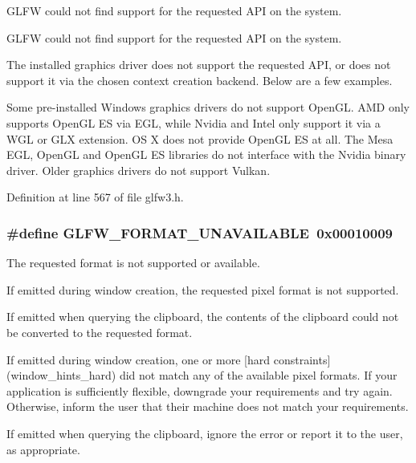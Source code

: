GLFW could not find support for the requested API on the system. 

GLFW could not find support for the requested API on the system.

The installed graphics driver does not support the requested API, or does not support it via the chosen context creation backend. Below are a few examples.

\begin{Desc}
\item[]Some pre-installed Windows graphics drivers do not support OpenGL. AMD only supports OpenGL ES via EGL, while Nvidia and Intel only support it via a WGL or GLX extension. OS X does not provide OpenGL ES at all. The Mesa EGL, OpenGL and OpenGL ES libraries do not interface with the Nvidia binary driver. Older graphics drivers do not support Vulkan. \end{Desc}


Definition at line 567 of file glfw3.h.\hypertarget{group__errors_g196e125ef261d94184e2b55c05762f14}{
\subsubsection[GLFW\_\-FORMAT\_\-UNAVAILABLE]{\setlength{\rightskip}{0pt plus 5cm}\#define GLFW\_\-FORMAT\_\-UNAVAILABLE~0x00010009}}
\label{group__errors_g196e125ef261d94184e2b55c05762f14}


The requested format is not supported or available. 

If emitted during window creation, the requested pixel format is not supported.

If emitted when querying the clipboard, the contents of the clipboard could not be converted to the requested format.

If emitted during window creation, one or more \mbox{[}hard constraints\mbox{]}(window\_\-hints\_\-hard) did not match any of the available pixel formats. If your application is sufficiently flexible, downgrade your requirements and try again. Otherwise, inform the user that their machine does not match your requirements.

\begin{Desc}
\item[]If emitted when querying the clipboard, ignore the error or report it to the user, as appropriate. \end{Desc}


